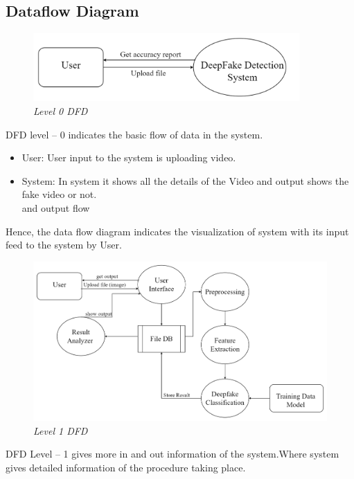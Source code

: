 
\subsection{Dataflow Diagram}
\begin{figure}[h]
    \centering
    \includegraphics[width= 4in ]{img/level0dfd.drawio.png}
    \caption{\textit{Level 0 DFD}}
\end{figure}

\justify
DFD level – 0 indicates the basic flow of data in the system.
\begin{itemize}
    \item User: User input to the system is uploading video.
    \item System: In system it shows all the details of the Video and output shows the fake video or not. \\
          and output flow
\end{itemize}
Hence, the data flow diagram indicates the visualization of system with its input feed to the system by User.\\
\begin{figure}[h]
    \centering
    \includegraphics[width= 6in ]{img/level1dfd.drawio.png}
    \caption{\textit{Level 1 DFD}}
\end{figure}
\justify
DFD Level – 1 gives more in and out information of the system.Where system gives detailed information of the procedure taking place.
